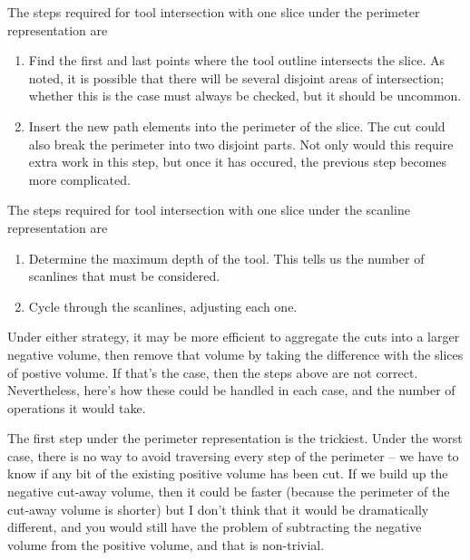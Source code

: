 \documentclass[titlepage,oneside,10pt]{article}
\begin{document}
The steps required for tool intersection with one slice under the
perimeter representation are
\begin{enumerate}
\item Find the first and last points where the tool outline intersects
  the slice. As noted, it is possible that there will be several
  disjoint areas of intersection; whether this is the case must always
  be checked, but it should be uncommon. 
\item Insert the new path elements into the perimeter of the
  slice. The cut could also break the perimeter into two disjoint
  parts. Not only would this require extra work in this step, but once
  it has occured, the previous step becomes more complicated.
\end{enumerate}

The steps required for tool intersection with one slice under the
scanline representation are
\begin{enumerate}
\item Determine the maximum depth of the tool. This tells us the
  number of scanlines that must be considered.
\item Cycle through the scanlines, adjusting each one.
\end{enumerate}

Under either strategy, it may be more efficient to aggregate the cuts into a
larger negative volume, then remove that volume by taking the
difference with the slices of postive volume. If that's the case, then
the steps above are not correct. Nevertheless, here's how these could
be handled in each case, and the number of operations it would take.

The first step under the perimeter representation is the
trickiest. Under the worst case, there is no way to avoid traversing
every step of the perimeter -- we have to know if any bit of the
existing positive volume has been cut. If we build up the negative
cut-away volume, then it could be faster (because the perimeter of the
cut-away volume is shorter) but I don't think that it would be
dramatically different, and you would still have the problem of
subtracting the negative volume from the positive volume, and that is
non-trivial. 
\end{document}
